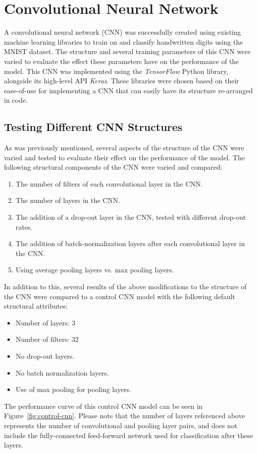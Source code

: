 \documentclass[a4paper]{article}
\begin{document}
\newpage

\section{Convolutional Neural Network}\label{cnn_lib}
A convolutional neural network (CNN) was successfully created using existing machine learning libraries to train on and classify handwritten digits using the MNIST dataset. The structure and several training parameters of this CNN were varied to evaluate the effect these parameters have on the performance of the model. This CNN was implemented using the \textit{TensorFlow} Python library, alongside its high-level API \textit{Keras}. These libraries were chosen based on their ease-of-use for implementing a CNN that can easily have its structure re-arranged in code. 

\subsection{Testing Different CNN Structures}

As was previously mentioned, several aspects of the structure of the CNN were varied and tested to evaluate their effect on the performance of the model. The following structural components of the CNN were varied and compared:
\begin{enumerate}
    \item The number of filters of each convolutional layer in the CNN.
    \item The number of layers in the CNN.
    \item The addition of a drop-out layer in the CNN, tested with different drop-out rates.
    \item The addition of batch-normalization layers after each convolutional layer in the CNN.
    \item Using average pooling layers vs. max pooling layers. 
\end{enumerate}
In addition to this, several results of the above modifications to the structure of the CNN were compared to a control CNN model with the following default structural attributes:
\begin{itemize}
    \item Number of layers: 3
    \item Number of filters: 32
    \item No drop-out layers.
    \item No batch normalization layers.
    \item Use of max pooling for pooling layers.
\end{itemize}
The performance curve of this control CNN model can be seen in Figure~\ref{fig:control-cnn}. Please note that the number of layers referenced above represents the number of convolutional and pooling layer pairs, and does not include the fully-connected feed-forward network used for classification after these layers.
\end{document}
